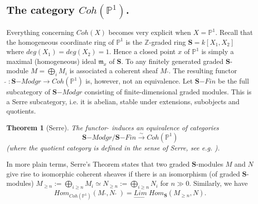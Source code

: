 \documentclass[a4paper,10pt]{amsart}
\def\Z{\mathbb{Z}}
\newtheorem{theo}{\bf{Theorem}}[section]
\numberwithin{equation}{section}
\begin{document}
\vspace{.2in}

\subsection{The category $Coh(\mathbb{P}^1)$.}

\vspace{.15in}

Everything concerning $Coh(X)$ becomes very explicit when $X=\mathbb{P}^1$.
Recall that the homogeneous coordinate ring of $\mathbb{P}^1$ is the $\Z$-graded ring $\mathbf{S}=k[X_1,X_2]$ where $deg(X_1)=deg(X_2)=1$. Hence a closed point $x$ of $\mathbb{P}^1$
is simply a maximal (homogeneous) ideal $\mathfrak{m}_x $ of $\mathbf{S}$. To any finitely generated graded $\mathbf{S}$-module $M=\bigoplus_i M_i$ is associated a coherent sheaf $M\;\widetilde{}$. The resulting functor $\widetilde{}\;:\mathbf{S}\mathrm{-}Modgr \to Coh(\mathbb{P}^1)$ is, however, not an equivalence. Let $\mathbf{S}\mathrm{-}Fin$ be the full subcategory of $\mathbf{S}\mathrm{-}Modgr$ consisting of finite-dimensional graded modules. This is a Serre subcategory, i.e. it is abelian, stable under extensions, subobjects and quotients.

\vspace{.1in}

\begin{theo}[Serre]\label{T:Serre} The functor $\widetilde{}$ induces an equivalence of categories
$$\mathbf{S}\mathrm{-}Modgr/\mathbf{S}\mathrm{-}Fin \stackrel{\sim}{\to} Coh(\mathbb{P}^1)$$
(where the quotient category is defined in the sense of Serre, see e.g. \cite{Serrequotientcategory}).
\end{theo}

\vspace{.1in}

In more plain terms, Serre's Theorem states that two graded $\mathbf{S}$-modules $M$ and $N$ give rise to isomorphic coherent sheaves if there is an isomorphism (of graded $\mathbf{S}$-modules) $M_{\geq n}:=\bigoplus_{i \geq n} M_i \simeq N_{\geq n}:=\bigoplus_{i \geq n} N_i$ for $n \gg 0$. Similarly, we have
\begin{equation}\label{E:defhomquotient}
{Hom}_{Coh(\mathbb{P}^1)}(M\;\widetilde{}, N\;\widetilde{}\;)=\underset{\longrightarrow} {{Lim}}\;{Hom}_{\mathbf{S}}(M_{\geq n},N).
\end{equation}
\end{document}
